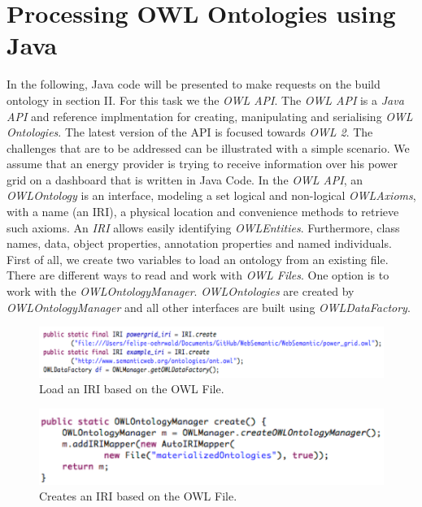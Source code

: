 \section{Processing OWL Ontologies using Java}

In the following, Java code will be presented to make requests on the build ontology in section II. For this task we the \textit{OWL API}. The \textit{OWL API} is a \textit{Java API} and reference implmentation for creating, manipulating and serialising \textit{OWL Ontologies}. The latest version of the API is focused towards \textit{OWL 2}. The challenges that are to be addressed can be illustrated with a simple scenario. We assume that an energy provider is trying to receive information over his power grid on a dashboard that is written in Java Code. In the \textit{OWL API}, an \textit{OWLOntology} is an interface, modeling a set logical and non-logical \textit{OWLAxioms}, with a name (an IRI), a physical location and convenience methods to retrieve such axioms. An \textit{IRI} allows easily identifying \textit{OWLEntities}. Furthermore, class names, data, object properties, annotation properties and named individuals.\\

First of all, we create two variables to load an ontology from an existing file. There are different ways to read and work with \textit{OWL Files}. One option is to work with the \textit{OWLOntologyManager}. \textit{OWLOntologies} are created by \textit{OWLOntologyManager} and all other interfaces are built using \textit{OWLDataFactory}. 

\begin{figure}[h]
\centering
\includegraphics[width=\textwidth]{img/load.png}
\caption{Load an IRI based on the OWL File.}
\label{fig:Load}
\end{figure}

\begin{figure}[h]
\centering
\includegraphics[width=\textwidth]{img/create.png}
\caption{Creates an IRI based on the OWL File.}
\label{fig:Create}
\end{figure}

